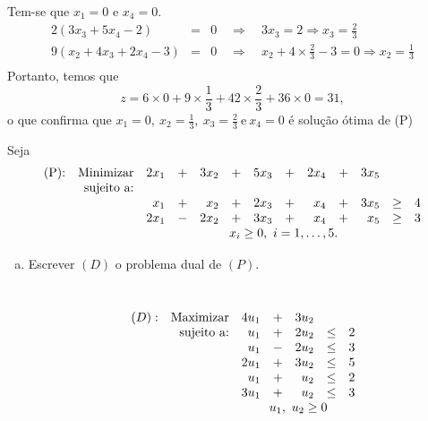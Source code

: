 \documentclass[12pt]{exam}
\begin{document}
\begin{questions}
\begin{solution}
Tem-se que $x_1 = 0$ e $x_4 = 0$.
	\begin{equation*}	
	\begin{array}{rcl}
	 2(3x_3 + 5x_4 - 2) & = & 0  \quad \Rightarrow  \quad 3x_3 = 2  \Rightarrow x_3  = \frac{2}{3} \\
	9(x_2 + 4x_3 + 2x_4 - 3) & = & 0   \quad \Rightarrow  \quad x_2 + 4\times\frac{2}{3} - 3= 0  \Rightarrow  x_2 = \frac{1}{3} \\
	\end{array}
	\end{equation*}	
	Portanto, temos que
	$$z = 6\times 0 + 9 \times \frac{1}{3} + 42 \times \frac{2}{3} + 36 \times 0 = 31,$$
	o que confirma que $x_1 =0,~x_2=\frac{1}{3},~x_3=\frac{2}{3}~\text{e}~x_4=0$ é solução ótima de (P)
	\end{solution}
	

		

\question Seja
	\begin{equation*}
		  \begin{array}{crrrrrrrrrrcc}
 \text{(P):} & \text{Minimizar} & 2x_1 & + & 3x_2 & + & 5x_3 & + & 2x_4 & + & 3x_5 &      & \\   
  	   & \text{sujeito a:}&        &   &      &   & &  & & & & \\
  	   &                  &  x_1 & + &  x_2 & + & 2x_3 & + & x_4 & + & 3x_5   &  \geq & 4 \\
  	   &                &  2x_1 & - & 2x_2 & + & 3x_3 & + & x_4 & + & x_5  & \geq& 3\\
  	   &                 &   \multicolumn{11}{c}{x_i \geq 0,~ i=1,\dots,5.}      
		  \end{array}	
	\end{equation*}
	\begin{enumerate}[a)]	
		\item Escrever $(D)$ o problema dual de $(P)$. 
		\begin{solution}\\
	\begin{equation*}	
				\begin{array}{c r r c r c c }
			(D) :&  \text{Maximizar}   & 4u_1 & + & 3u_2 \\
			& \text{sujeito a:} & u_1    & + & 2u_2 & \leq   & 2 \\
			&                 & u_1    & -  & 2u_2 & \leq   & 3 \\
			&                 & 2 u_1 & + & 3u_2 & \leq  & 5 \\
			&                 & u_1    & +  &  u_2  & \leq   &  2 \\			
			&                 & 3u_1  & + &  u_2   & \leq   & 3 \\			
			&                 & \multicolumn{5}{c}{u_1,~u_2 \geq 0}
			\end{array}
	\end{equation*}


\end{solution}
\end{enumerate}
\end{questions}
\end{document}
